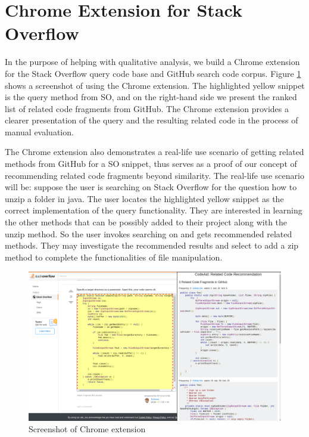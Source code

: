 \section{Chrome Extension for Stack Overflow}
\label{sec:chrome}

In the purpose of helping with qualitative analysis, we build a Chrome extension for the Stack Overflow query code base and GitHub search code corpus. Figure \ref{fig:chrome} shows a screenshot of using the Chrome extension. The highlighted yellow snippet is the query method from SO, and on the right-hand side we present the ranked list of related code fragments from GitHub. The Chrome extension provides a clearer presentation of the query and the resulting related code in the process of manual evaluation.

The Chrome extension also demonstrates a real-life use scenario of getting related methods from GitHub for a SO snippet, thus serves as a proof of our concept of recommending related code fragments beyond similarity.
The real-life use scenario will be: suppose the user is searching on Stack Overflow for the question {\ttt how to unzip a folder in java}. The user locates the highlighted yellow snippet as the correct implementation of the query functionality. They are interested in learning the other methods that can be possibly added to their project along with the {\ttt unzip} method. So the user invokes searching on {\tool} and gets recommended related methods. They may investigate the recommended results and select to add a {\ttt zip} method to complete the functionalities of file manipulation. 

\begin{figure}[!h]
	\includegraphics[width=\linewidth]{figures/ui.png}
	\caption{Screenshot of Chrome extension}
	\label{fig:chrome}
\end{figure}